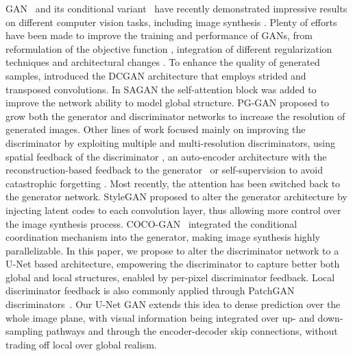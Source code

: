 \documentclass[10pt,twocolumn,letterpaper]{article}
\begin{document}
GAN~\cite{goodfellow2014generative} and its conditional variant~\cite{Mirza2014ConditionalGA} have recently demonstrated impressive results on different computer vision tasks, including image synthesis \cite{Radford2016UnsupervisedRL,Zhang_SAGAN19,karras2018progressive, Brock2019, Karras2018ASG, Lin2019COCOGANGB,Dey2018RankGANAM}. Plenty of efforts have been made to improve the training and performance of GANs, from reformulation of the objective function \cite{MaoLXLW16,Arjovsky2017WGAN,Lim2017GeometricG,Nowozin2016fGANTG}, integration of different regularization techniques \cite{Zhang2019ConsistencyRF,miyato2018spectral,Roth_NeurIPS2017,Zhang2018PAGANIG} and architectural changes \cite{Radford2016UnsupervisedRL,karras2018progressive,Durugkar2016GenerativeMN,Lin2019COCOGANGB}.
To enhance the quality of generated samples, \cite{Radford2016UnsupervisedRL} introduced the DCGAN architecture that employs strided and transposed convolutions. In SAGAN \cite{Zhang_SAGAN19} the self-attention block was added to improve the network ability to model global structure. PG-GAN \cite{karras2018progressive} proposed to grow both the generator and discriminator networks to increase the resolution of generated images. Other lines of work focused mainly on improving the discriminator by exploiting multiple \cite{Mordido2018DropoutGANLF, Durugkar2016GenerativeMN, Doan2018OnlineAC} and multi-resolution \cite{Wang2017HighResolutionIS,Sharma2018ImprovedTW} discriminators, using spatial feedback of the discriminator \cite{Huh2019FeedbackAL}, an auto-encoder architecture with the reconstruction-based feedback to the generator~\cite{zhao2016energy} or self-supervision to avoid catastrophic forgetting \cite{ChenSS2019}. 
Most recently, the attention has been switched back to the generator network. StyleGAN \cite{Karras2018ASG} proposed to alter the generator architecture by injecting latent codes to each convolution layer, thus allowing more control over the image synthesis process. COCO-GAN~\cite{Lin2019COCOGANGB} integrated the conditional coordination mechanism into the generator, making image synthesis highly parallelizable. 
In this paper, we propose to alter the discriminator network to a U-Net based architecture, empowering the discriminator to capture better both global and local structures, enabled by per-pixel discriminator feedback. 
Local discriminator feedback is also commonly applied through PatchGAN discriminators~\cite{isola2017image}. Our U-Net GAN extends this idea to dense prediction over the whole image plane, with visual information being integrated over up- and down-sampling pathways and through the encoder-decoder skip connections, without trading off local over global realism.
\end{document}
